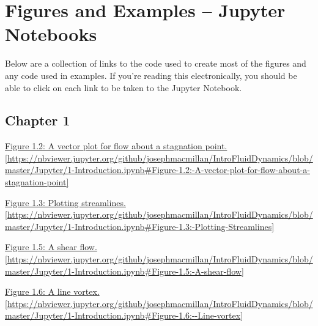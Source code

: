 
\chapter{Figures and Examples -- Jupyter Notebooks}

Below are a collection of links to the code used to create most of the figures and any code used in examples.  If you're reading this electronically, you should be able to click on each link to be taken to the Jupyter Notebook.

\section{Chapter 1}

\href{https://nbviewer.jupyter.org/github/josephmacmillan/IntroFluidDynamics/blob/master/Jupyter/1-Introduction.ipynb#Figure-1.2:-A-vector-plot-for-flow-about-a-stagnation-point}{Figure 1.2: A vector plot for flow about a stagnation point.  [\url{https://nbviewer.jupyter.org/github/josephmacmillan/IntroFluidDynamics/blob/master/Jupyter/1-Introduction.ipynb\#Figure-1.2:-A-vector-plot-for-flow-about-a-stagnation-point}]}

\vspace{0.1in}

\noindent \href{https://nbviewer.jupyter.org/github/josephmacmillan/IntroFluidDynamics/blob/master/Jupyter/1-Introduction.ipynb#Figure-1.3:-Plotting-Streamlines}{Figure 1.3: Plotting streamlines. [\url{https://nbviewer.jupyter.org/github/josephmacmillan/IntroFluidDynamics/blob/master/Jupyter/1-Introduction.ipynb\#Figure-1.3:-Plotting-Streamlines}]}

\vspace{0.1in}

\noindent \href{https://nbviewer.jupyter.org/github/josephmacmillan/IntroFluidDynamics/blob/master/Jupyter/1-Introduction.ipynb#Figure-1.5:-A-shear-flow}{Figure 1.5: A shear flow. [\url{https://nbviewer.jupyter.org/github/josephmacmillan/IntroFluidDynamics/blob/master/Jupyter/1-Introduction.ipynb\#Figure-1.5:-A-shear-flow}]}

\vspace{0.1in}

\noindent \href{https://nbviewer.jupyter.org/github/josephmacmillan/IntroFluidDynamics/blob/master/Jupyter/1-Introduction.ipynb#Figure-1.6:--Line-vortex}{Figure 1.6: A line vortex. [\url{https://nbviewer.jupyter.org/github/josephmacmillan/IntroFluidDynamics/blob/master/Jupyter/1-Introduction.ipynb\#Figure-1.6:--Line-vortex}]}

